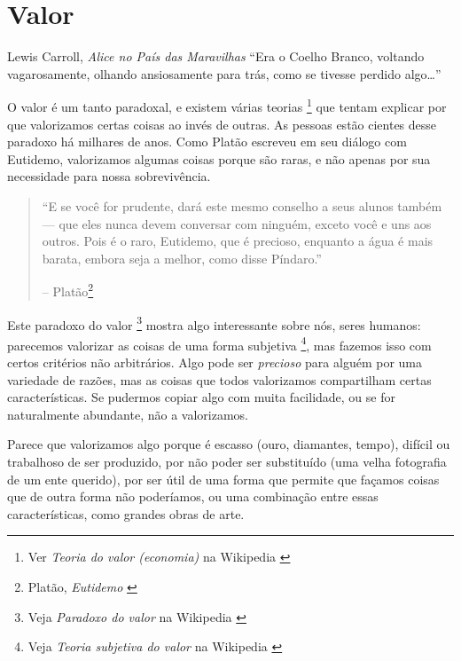 \chapter{Valor}
\label{les:10}

\begin{chapquote}{Lewis Carroll, \textit{Alice no País das Maravilhas}}
\enquote{Era o Coelho Branco, voltando vagarosamente, olhando ansiosamente para trás, como se tivesse perdido algo\ldots}
\end{chapquote}

O valor é um tanto paradoxal, e existem várias teorias \footnote{Ver \textit {Teoria do valor (economia)} na Wikipedia \cite{wiki:theory-of-value}} que tentam explicar por que valorizamos certas coisas ao invés de outras. As pessoas estão cientes desse paradoxo há milhares de anos. Como Platão escreveu em seu diálogo com Eutidemo, valorizamos algumas coisas porque são raras, e não apenas por sua necessidade para nossa sobrevivência.

\begin{quotation}\begin{samepage}
\enquote{E se você for prudente, dará este mesmo conselho a seus alunos também --- que eles nunca devem conversar com ninguém, exceto você e uns aos outros. Pois é o raro, Eutidemo, que é precioso, enquanto a água é mais barata, embora seja a melhor, como disse Píndaro.}
\begin{flushright} -- Platão\footnote{Platão, \textit{Eutidemo} \cite{euthydemus}}
\end{flushright}\end{samepage}\end{quotation}

Este paradoxo do valor \footnote{Veja \textit {Paradoxo do valor} na Wikipedia \cite {wiki:paradox-of-value}} mostra algo interessante sobre nós, seres humanos: parecemos valorizar as coisas de uma forma subjetiva \footnote{Veja \textit{Teoria subjetiva do valor} na Wikipedia \cite{wiki:subjective-theory-of-value}}, mas fazemos isso com certos critérios não arbitrários. Algo pode ser \textit{precioso} para alguém por uma variedade de razões, mas as coisas que todos valorizamos compartilham certas características. Se pudermos copiar algo com muita facilidade, ou se for naturalmente abundante, não a valorizamos.

Parece que valorizamos algo porque é escasso (ouro, diamantes, tempo), difícil ou trabalhoso de ser produzido, por não poder ser substituído (uma velha fotografia de um ente querido), por ser útil de uma forma que permite que façamos coisas que de outra forma não poderíamos, ou uma combinação entre essas características, como grandes obras de arte.

